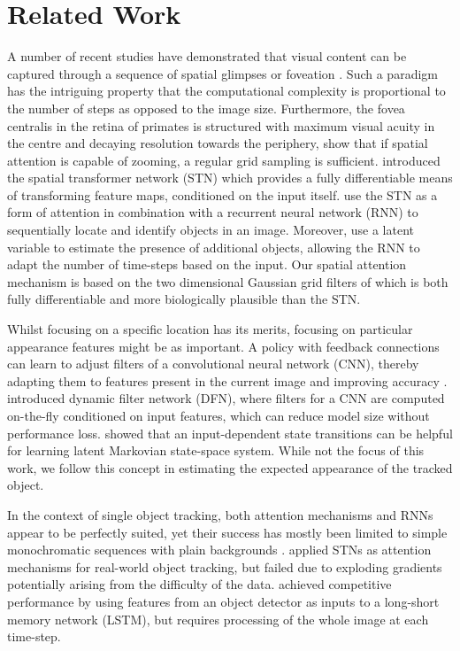 \section{Related Work}
\label{sec:hart_background}

A number of recent studies have demonstrated that visual content can be captured through a sequence of spatial glimpses or foveation \cite{Graves2014recurrent, Gregor2016towards}. Such a paradigm has the intriguing property that the computational complexity is proportional to the number of steps as opposed to the image size.
Furthermore, the fovea centralis in the retina of primates is structured with maximum visual acuity in the centre and decaying resolution towards the periphery, \citet{Olshausen2016foveal} show that if spatial attention is capable of zooming, a regular grid sampling is sufficient. 
\citet{Jaderberg2015} introduced the spatial transformer network (STN) which provides a fully differentiable means of transforming feature maps, conditioned on the input itself. \citet{Eslami2016air} use the STN as a form of attention in combination with a recurrent neural network (RNN) to sequentially locate and identify objects in an image. Moreover, \citet{Eslami2016air} use a latent variable to estimate the presence of additional objects, allowing the RNN to adapt the number of time-steps based on the input. 
Our spatial attention mechanism is based on the two dimensional Gaussian grid filters of  \cite{Kahou2015ratm} which is both fully differentiable and more biologically plausible than the STN.  


    
Whilst focusing on a specific location has its merits, focusing on particular appearance features might be as important. A policy with feedback connections can learn to adjust filters of a convolutional neural network (CNN), thereby adapting them to features present in the current image and improving accuracy \cite{Stollenga2014}. \citet{Brabandere2016dfn} introduced dynamic filter network (DFN), where filters for a CNN are computed on-the-fly conditioned on input features, which can reduce model size without performance loss. \citet{Karl2017dvbf} showed that an input-dependent state transitions can be helpful for learning latent Markovian state-space system. While not the focus of this work, we follow this concept in estimating the expected appearance of the tracked object.
    
In the context of single object tracking, both attention mechanisms and RNNs appear to be perfectly suited, yet their success has mostly been limited to simple monochromatic sequences with plain backgrounds \cite{Kahou2015ratm}. \citet{Cheung2016gtc} applied STNs \cite{Jaderberg2015} as attention mechanisms for real-world object tracking, but failed due to exploding gradients potentially arising from the difficulty of the data.
\citet{Ning2016} achieved competitive performance by using features from an object detector as inputs to a long-short memory network (LSTM), but requires processing of the whole image at each time-step. 

